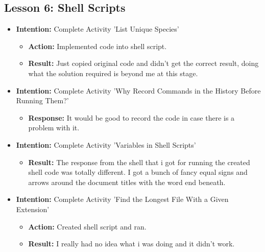 \documentclass{article}
\begin{document}
\subsection{Lesson 6: Shell Scripts}
\date{05/09/2019 17:40}
\begin{itemize}

\item{\textbf{Intention:} Complete Activity 'List Unique Species'}

\begin{itemize}
\item{\textbf{Action:} Implemented code into shell script.}

\item{\textbf{Result:} Just copied original code and didn't get the correct result, doing what the solution required is beyond me at this stage.}

\end{itemize}

\item{\textbf{Intention:} Complete Activity 'Why Record Commands in the History Before Running Them?'}

\begin{itemize}
\item{\textbf{Response:} It would be good to record the code in case there is a problem with it.}


\end{itemize}


\item{\textbf{Intention:} Complete Activity 'Variables in Shell Scripts'}

\begin{itemize}

\item{\textbf{Result:} The response from the shell that i got for running the created shell code was totally different. I got a bunch of fancy equal signs and arrows around the document titles with the word end beneath.}


\end{itemize}


\item{\textbf{Intention:} Complete Activity 'Find the Longest File With a Given Extension'}

\begin{itemize}

\item{\textbf{Action:} Created shell script and ran.}

\item{\textbf{Result:} I really had no idea what i was doing and it didn't work.}


\end{itemize}
\end{itemize}
\end{document}
